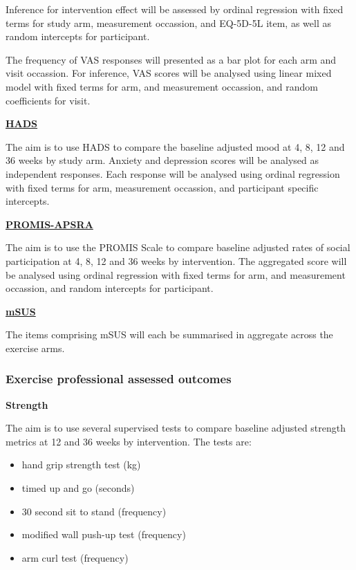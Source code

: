 \documentclass[
]{article}
\providecommand{\tightlist}{%
  \setlength{\itemsep}{0pt}\setlength{\parskip}{0pt}}
\begin{document}
Inference for intervention effect will be assessed by ordinal regression with fixed terms for study arm, measurement occassion, and EQ-5D-5L item, as well as random intercepts for participant.

The frequency of VAS responses will presented as a bar plot for each arm and visit occassion.
For inference, VAS scores will be analysed using linear mixed model with fixed terms for arm, and measurement occassion, and random coefficients for visit.


\label{analysis:hads}
\hyperref[outcome:hads]{\textbf{HADS}}

The aim is to use HADS to compare the baseline adjusted mood at 4, 8, 12 and 36 weeks by study arm.
Anxiety and depression scores will be analysed as independent responses.
Each response will be analysed using ordinal regression with fixed terms for arm, measurement occassion, and participant specific intercepts.


\label{analysis:promis-aspra}
\hyperref[outcome:promis-apsra]{\textbf{PROMIS-APSRA}}

The aim is to use the PROMIS Scale to compare baseline adjusted rates of social participation at 4, 8, 12 and 36 weeks by intervention.
The aggregated score will be analysed using ordinal regression with fixed terms for arm, and measurement occassion, and random intercepts for participant.


\label{analysis:msus}
\hyperref[outcome:msus]{\textbf{mSUS}}

The items comprising mSUS will each be summarised in aggregate across the exercise arms.


\hypertarget{exercise-professional-assessed-outcomes}{%
  \subsubsection{Exercise professional assessed outcomes}\label{exercise-professional-assessed-outcomes}}


\textbf{Strength}

The aim is to use several supervised tests to compare baseline adjusted strength metrics at 12 and 36 weeks by intervention.
The tests are:

\begin{itemize}
  \tightlist
  \item hand grip strength test (kg)
  \item timed up and go (seconds)
  \item 30 second sit to stand (frequency)
  \item modified wall push-up test (frequency)
  \item arm curl test (frequency)

\end{itemize}
\end{document}
